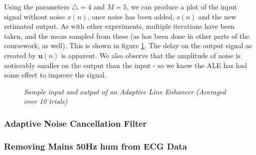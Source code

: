 \documentclass[./main.tex]{subfiles}
\begin{document}
Using the parameters $ \bigtriangleup = 4$ and $ M = 5$, we can produce a plot of the input signal without noise $x(n)$, once noise has been added, $s(n)$ and the new estimated output. As with other experiments, multiple iterations have been taken, and the mean sampled from these (as has been done in other parts of the coursework, as well). This is shown in figure \ref{fig:3_3_b_overview}. The delay on the output signal as created by $ \mathbf{u}(n) $ is apparent. We also observe that the amplitude of noise is noticeably smaller on the output than the input - so we know the ALE has had some effect to improve the signal.

\begin{figure}[h]
\centering 
\resizebox{\textwidth}{!}{}
\caption{\textit{Sample input and output of an Adaptive Line Enhancer (Averaged over 10 trials)}}
\label{fig:3_3_b_overview}
\end{figure}


\subsubsection{Adaptive Noise Cancellation Filter}


\subsubsection{Removing Mains 50Hz hum from ECG Data}


%  	


 		
\end{document}
